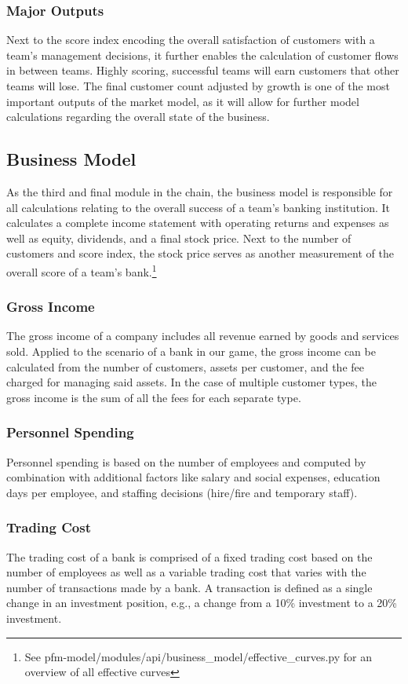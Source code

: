 \subsubsection{Major Outputs}
Next to the score index encoding the overall satisfaction of customers with a team's management decisions, it further enables the calculation of customer flows in between teams. Highly scoring, successful teams will earn customers that other teams will lose. The final customer count adjusted by growth is one of the most important outputs of the market model, as it will allow for further model calculations regarding the overall state of the business.


\subsection{Business Model}
As the third and final module in the chain, the business model is responsible for all calculations relating to the overall success of a team's banking institution. It calculates a complete income statement with operating returns and expenses as well as equity, dividends, and a final stock price. Next to the number of customers and score index, the stock price serves as another measurement of the overall score of a team's bank.\footnote{See pfm-model/modules/api/business\_model/effective\_curves.py for an overview of all effective curves}

\subsubsection{Gross Income}
The gross income of a company includes all revenue earned by goods and services sold. Applied to the scenario of a bank in our game, the gross income can be calculated from the number of customers, assets per customer, and the fee charged for managing said assets. In the case of multiple customer types, the gross income is the sum of all the fees for each separate type.

\subsubsection{Personnel Spending}
Personnel spending is based on the number of employees and computed by combination with additional factors like salary and social expenses, education days per employee, and staffing decisions (hire/fire and temporary staff).

\subsubsection{Trading Cost}
The trading cost of a bank is comprised of a fixed trading cost based on the number of employees as well as a variable trading cost that varies with the number of transactions made by a bank. A transaction is defined as a single change in an investment position, e.g., a change from a 10\% investment to a 20\% investment.

